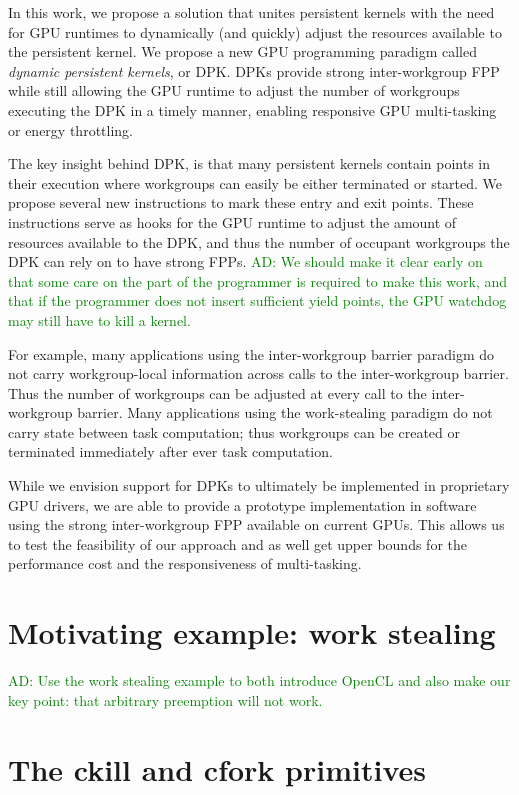 \documentclass[nocopyrightspace]{sigplanconf-pldi16}
\newcommand{\ADComment}[1]{\textcolor{green}{AD: #1}}
\begin{document}
In this work, we propose a solution that unites persistent kernels
with the need for GPU runtimes to dynamically (and quickly) adjust the
resources available to the persistent kernel. We propose a new GPU
programming paradigm called \emph{dynamic persistent kernels}, or
DPK. DPKs provide strong inter-workgroup FPP while still allowing the
GPU runtime to adjust the number of workgroups executing the DPK in a
timely manner, enabling responsive GPU multi-tasking or energy
throttling.

The key insight behind DPK, is that many persistent kernels contain
points in their execution where workgroups can easily be either
terminated or started. We propose several new instructions to mark
these entry and exit points. These instructions serve as hooks for the
GPU runtime to adjust the amount of resources available to the DPK,
and thus the number of occupant workgroups the DPK can rely on to have
strong FPPs. \ADComment{We should make it clear early on that some care on the part of the programmer is required to make this work, and that if the programmer does not insert sufficient yield points, the GPU watchdog may still have to kill a kernel.}

For example, many applications using the inter-workgroup barrier
paradigm do not carry workgroup-local information across calls to the
inter-workgroup barrier. Thus the number of workgroups can be adjusted
at every call to the inter-workgroup barrier. Many applications using
the work-stealing paradigm do not carry state between task
computation; thus workgroups can be created or terminated immediately
after ever task computation.

While we envision support for DPKs to ultimately be implemented in
proprietary GPU drivers, we are able to provide a prototype
implementation in software using the strong inter-workgroup FPP
available on current GPUs. This allows us to test the feasibility of
our approach and as well get upper bounds for the performance cost and
the responsiveness of multi-tasking.

\section{Motivating example: work stealing}

\ADComment{Use the work stealing example to both introduce OpenCL and
  also make our key point: that arbitrary preemption will not work.}


\section{The ckill and cfork primitives}
\end{document}
